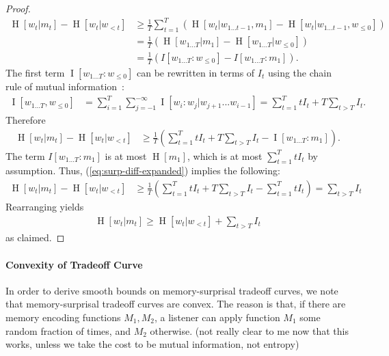 \documentclass[11pt,letterpaper]{article}
\newcommand\mhahn[1]{{\color{red}(#1)}}
\begin{document}
\begin{proof}
\begin{align}\label{eq:plugged}
\operatorname{H}[w_t | m_t] - \operatorname{H}[w_t | w_{<t}]& \geq \frac{1}{T} \sum_{t=1}^T ( \operatorname{H}[w_t|w_{1\dots t-1}, m_1] - \operatorname{H}[w_t | w_{1\dots t-1}, w_{\leq 0}]  )    \\
& = \frac{1}{T} \left(\operatorname{H}[w_{1\dots T} | m_1] - \operatorname{H}[w_{1\dots T} | w_{\leq 0}]\right)  \\
& = \frac{1}{T} \left(I[w_{1\dots T}: w_{\leq 0}] - I[w_{1\dots T}: m_1]\right).
\end{align}
	The first term $\operatorname{I}[w_{1\dots T}: w_{\leq 0}]$ can be rewritten in terms of $I_t$ using the chain rule of mutual information~\citep{cover2006elements}:
\begin{align}\label{eq:i-expanded}
	\operatorname{I}[w_{1\dots T}, w_{\leq 0}] &= \sum_{i=1}^T \sum_{j=-1}^{-\infty} \operatorname{I}[w_i: w_j | w_{j+1}...w_{i-1}] = \sum_{t=1}^T t I_t + T \sum_{t > T} I_t.
\end{align}
Therefore
\begin{align}\label{eq:surp-diff-expanded}
\operatorname{H}[w_t | m_t] - \operatorname{H}[w_t | w_{<t}]& \geq \frac{1}{T} \left(\sum_{t=1}^T t I_t + T \sum_{t > T} I_t - \operatorname{I}[w_{1\dots T}: m_1]\right).
\end{align}
The term $I[w_{1\dots T}:m_1]$ is at most $\operatorname{H}[m_1]$, which is at most $\sum_{t=1}^T t I_t$ by assumption. Thus,  (\ref{eq:surp-diff-expanded}) implies the following:
\begin{align}\label{eq:bounding-by-mem}
\operatorname{H}[w_t | m_t] - \operatorname{H}[w_t | w_{<t}]& \geq \frac{1}{T} \left(\sum_{t=1}^T t I_t + T \sum_{t > T} I_t - \sum_{t=1}^T t I_t\right) = \sum_{t > T} I_t
\end{align}
Rearranging yields
\begin{align}
\operatorname{H}[w_t|m_t] \geq \operatorname{H}[w_t | w_{<t}] + \sum_{t > T} I_t
\end{align}
as claimed.
\end{proof}

\paragraph{Convexity of Tradeoff Curve}
In order to derive smooth bounds on memory-surprisal tradeoff curves, we note that memory-surprisal tradeoff curves are convex.
The reason is that, if there are memory encoding functions $M_1, M_2$, a listener can apply function $M_1$ some random fraction of times, and $M_2$ otherwise.
\mhahn{not really clear to me now that this works, unless we take the cost to be mutual information, not entropy}
\end{document}
